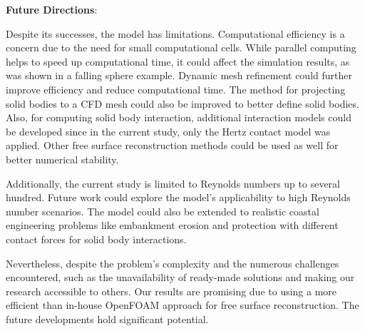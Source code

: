 \textbf{Future Directions}:

Despite its successes, the model has limitations. Computational efficiency is a concern due to the need for small computational cells. While parallel computing helps to speed up computational time, it could affect the simulation results, as was shown in a falling sphere example. Dynamic mesh refinement could further improve efficiency and reduce computational time. The method for projecting solid bodies to a CFD mesh could also be improved to better define solid bodies. Also, for computing solid body interaction, additional interaction models could be developed since in the current study, only the Hertz contact model was applied. Other free surface reconstruction methods could be used as well for better numerical stability.

Additionally, the current study is limited to Reynolds numbers up to several hundred. Future work could explore the model's applicability to high Reynolds number scenarios. The model could also be extended to realistic coastal engineering problems like embankment erosion and protection with different contact forces for solid body interactions.

Nevertheless, despite the problem's complexity and the numerous challenges encountered, such as the unavailability of ready-made solutions and making our research accessible to others. Our results are promising due to using a more efficient than in-house OpenFOAM approach for free surface reconstruction. The future developments hold significant potential.